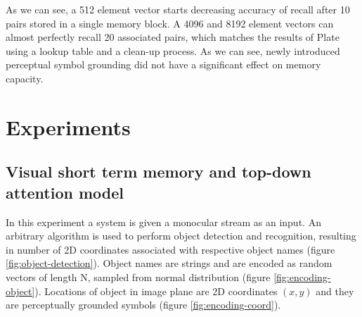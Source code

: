 \documentclass[conference]{IEEEtran}
\begin{document}
	As we can see, a 512 element vector starts decreasing accuracy of recall after 10 pairs stored in a single memory block. A 4096 and 8192 element vectors can almost perfectly recall 20 associated pairs, which matches the results of Plate using a lookup table and a clean-up process. As we can see, newly introduced perceptual symbol grounding did not have a significant effect on memory capacity.
	
	\section{Experiments}
	\label{sec:experiments}
	\subsection{Visual short term memory and top-down attention model}
	
	In this experiment a system is given a monocular stream as an input. An arbitrary algorithm is used to perform object detection and recognition, resulting in number of 2D coordinates associated with respective object names (figure \ref{fig:object-detection}). Object names are strings and are encoded as random vectors of length N, sampled from normal distribution (figure \ref{fig:encoding-object}). Locations of object in image plane are 2D coordinates $(x,y)$ and they are perceptually grounded symbols (figure \ref{fig:encoding-coord}).
	
\end{document}
